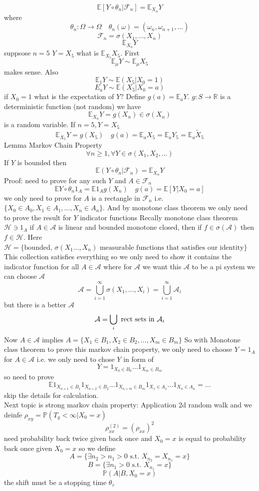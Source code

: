 \documentclass[11pt]{article}
\begin{document}
\[
    \mathbb{E}[Y \circ \theta_n | \mathcal{F}_n ] = \mathbb{E}_{X_n} Y
\] 
where
\[
    \theta_n : \Omega \to \Omega  \quad \theta_n(\omega) = (\omega_n, \omega_{n+1},\dots)
\] 
\[
\mathcal{F}_n = \sigma(X_1,\dots,X_n)
\] 
\[
    \mathbb{E}_{X_n} Y
\] 
suppsose $n = 5$  $Y = X_5$ what is $ \mathbb{E}_{X_5} X_5$.
First 
\[
\mathbb{E}_\mu Y \sim \mathbb{E}_\mu X_5
\] 
makes sense.
Also
\[
\mathbb{E}_1 Y \sim \mathbb{E}(X_5 | X_0 = 1)
\] 
\[
E_a Y \sim \mathbb{E}(X_5 | X_0 = a)
\] 
if $X_0 = 1$ what is the expectation of $Y$? 
Define $g(a) = \mathbb{E}_a Y$.
$g : S \to \mathbb{R}$ is a deterministic function (not random)
we have
\[
    \mathbb{E}_{X_n} Y = g(X_n) \in \sigma(X_n)
\] 
is a random variable.
If $n =5 , Y = X_5$
 \[
     \mathbb{E}_{X_5} Y = g(X_5) \quad g(a) = \mathbb{E}_a X_5 = \mathbb{E}_a Y_5 = \mathbb{E}_a \tilde X_5
\] 
Lemma Markov Chain Property
\[
\forall n \ge 1, \forall Y \in \sigma(X_1,X_2,\dots)
\] 
If $Y$ is bounded then 
 \[
     \mathbb{E}(Y \circ \theta_n | \mathcal{F}_n) = \mathbb{E}_{X_n} Y
\] 
Proof:
need to prove for any such $Y$ and $A \in \mathcal{F}_n$
 \[
     \mathbb{E}Y \circ \theta_n 1_A =  \mathbb{E} 1_A g(X_n) \quad g(a) = \mathbb{E}[Y | X_0 = a]
\] 
we only need to prove for $A$ is a rectangle in  $ \mathcal{F}_n$ i.e. $\{X_0 \in A_0, X_1 \in A_1, \dots, X_n \in A_n\}$.
And by monotone class theorem we only need to prove the result for $Y$ indicator functions
Recally monotone class theorem  $\mathcal{H} \ni 1_A$ if  $A \in \mathcal{A}$ is linear and bounded monotone closed, then if  $f \in \sigma( \mathcal{A})$ then $f \in \mathcal{H}$. 
Here $\mathcal{H} = \{\text{bounded, $\sigma(X_1\dots,X_n)$ measurable functions that satisfies our identity}\}$ 
This collection satisfies everything so we only need to show it contains the indicator function for all $A \in \mathcal{A}$ where
for  $ \mathcal{A}$ we want this  $\mathcal{ A}$ to be a pi system
we can choose  $ \mathcal{A}$
\[
    \mathcal{A} = \bigcup_{i=1}^{\infty} \sigma (X_1,\dots,X_i) = \bigcup_{i=1}^{\infty}  \mathcal{A}_i
\] 
but there is a better $ \mathcal{A}$
\[
    \mathcal{A} = \bigcup_i \text{ rect sets in $ \mathcal{A}_i$}
\] 
Now $ A \in \mathcal{A}$ implies $A = \{ X_1 \in B_1, X_2 \in B_2, \dots, X_m \in B_m\}$
So with Monotone class theorem to prove this markov chain property, we only need to choose $Y =1_A$ for  $A \in \mathcal{A}$
i.e. we only need to chose  $Y$ in form of
 \[
    Y = 1_{X_0 \in B_0} \dots 1_{X_m \in B_m}
\] 
so need to prove
\[
    \mathbb{E} 1_{X_{n+1} \in B_1} 1_{X_{n+2} \in B_2} \dots 1_{X_{n+m} \in B_m} 1_{X_1 \in A_1} \dots  1_{X_n \in A_n} =  \dots
\] 
skip the details for calculation.\\
Next topic is strong markov chain property:
Application 2d random walk and we deinfe $\rho_{xy} = \mathbb{P}(T_y < \infty | X_0 = x)$
\[
    \rho^{(2)}_{xx} = (\rho_{xx})^2
\] 
need probability back twice given back once and $X_0 = x$ is equal to probability back once given $X_0 = x$
so we define
\[
    A =  \{ \exists n_2 > n_1 > 0 \text{ s.t. } X_{n_2} = X_{n_1} = x\}
\] 
\[
    B = \{ \exists n_1 > 0 \text{ s.t. } X_{n_1} = x\}
\] 
\[
\mathbb{P}(A | B, X_0 = x)
\] 
the shift must be a stopping time $\theta_{\tau}$
\end{document}
